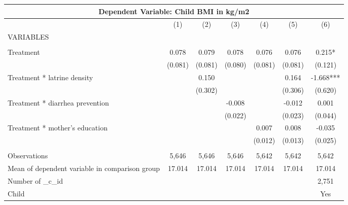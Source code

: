 \begin{tabular}{lcccccc}
\multicolumn{7}{c}{Dependent Variable: Child BMI in kg/m2} \\ \hline
 & (1) & (2) & (3) & (4) & (5) & (6) \\
VARIABLES &  &  &  &  &  &  \\ \hline
 &  &  &  &  &  &  \\
Treatment & 0.078 & 0.079 & 0.078 & 0.076 & 0.076 & 0.215* \\
 & (0.081) & (0.081) & (0.080) & (0.081) & (0.081) & (0.121) \\
Treatment * latrine density &  & 0.150 &  &  & 0.164 & -1.668*** \\
 &  & (0.302) &  &  & (0.306) & (0.620) \\
Treatment * diarrhea prevention &  &  & -0.008 &  & -0.012 & 0.001 \\
 &  &  & (0.022) &  & (0.023) & (0.044) \\
Treatment * mother's education &  &  &  & 0.007 & 0.008 & -0.035 \\
 &  &  &  & (0.012) & (0.013) & (0.025) \\
 &  &  &  &  &  &  \\
Observations & 5,646 & 5,646 & 5,646 & 5,642 & 5,642 & 5,642 \\
Mean of dependent variable in comparison group & 17.014 & 17.014 & 17.014 & 17.014 & 17.014 & 17.014 \\
Number of \_c\_id &  &  &  &  &  & 2,751 \\
 Child &  &  &  &  &  & Yes \\ \hline
\end{tabular}
